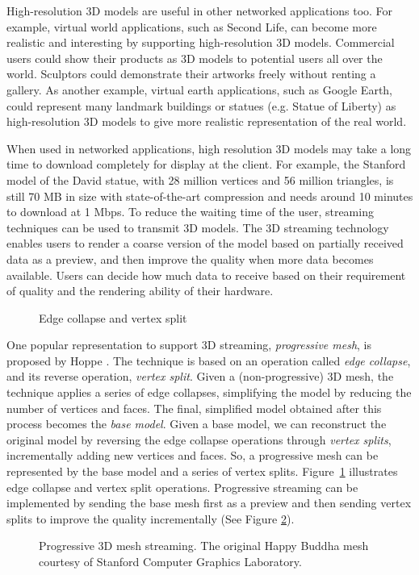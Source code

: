     High-resolution 3D models are useful in other networked applications too. 
    For example, virtual world applications,
    such as Second Life, can become more realistic and interesting by
    supporting high-resolution 3D models. 
    Commercial users could show their products as 3D models to potential users all over 
    the world. Sculptors could demonstrate their artworks freely without renting a gallery.
    As another example, virtual earth applications, 
    such as Google Earth, could represent many landmark buildings or statues
    (e.g. Statue of Liberty) as high-resolution 3D models to
    give more realistic representation of the real world.

    When used in networked applications, 
    high resolution 3D models may take a long time to download completely
    for display at the client. 
    For example, the Stanford model of the David statue, with 28 million vertices and
    56 million triangles, is still 70 MB in size with
    state-of-the-art compression \cite{alliez2001progressive} and needs around 10 minutes
    to download at 1 Mbps.  
    To reduce the waiting time of the user, 
    streaming techniques can be used to transmit 3D models. 
    The 3D streaming technology enables users to render a coarse version of the model
    based on partially received data as a preview, 
    and then improve the quality when more data becomes available. 
    Users can decide how much data to receive based on their requirement of quality
    and the rendering ability of their hardware.

\begin{figure}[htbp!]
\centering
{}
\caption{Edge collapse and vertex split}\label{f:intro:split2}
\end{figure}
    One popular representation to support 3D streaming, \textit{progressive mesh}, 
    is proposed by Hoppe \cite{hoppe96progressive}.
    The technique is based on an
    operation called \textit{edge collapse}, and its reverse
    operation, \textit{vertex split}.  Given a (non-progressive)
    3D mesh, the technique applies a series of edge collapses,
    simplifying the model by reducing the number of vertices and
    faces.  The final, simplified model obtained after this
    process becomes the \textit{base model}.  Given a base model,
    we can reconstruct the original model by reversing
    the edge collapse operations through \textit{vertex splits},
    incrementally adding new vertices and faces. So, a
    progressive mesh can be represented by the base
    model and a series of vertex splits.  
    Figure~\ref{f:intro:split2} illustrates edge
    collapse and vertex split operations.
    Progressive streaming can be implemented by sending the base mesh
    first as a preview and then sending vertex splits to improve 
    the quality incrementally (See Figure \ref{f:intro:progressive}).
    \begin{figure}[htbp!]
    \centering
    \caption[Progressive 3D mesh streaming.]{
    Progressive 3D mesh streaming. The original Happy Buddha mesh 
    courtesy of Stanford Computer Graphics Laboratory.
    \label{f:intro:progressive}}
    \end{figure}
    

